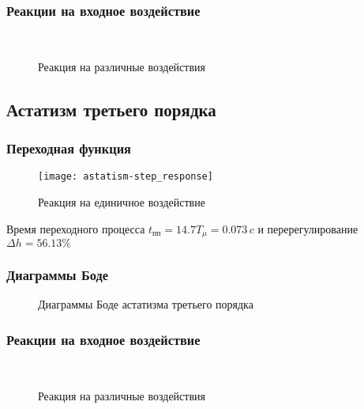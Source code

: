 			\subsubsection{Реакции на входное воздействие}
				\begin{figure}[H]
					\centering
					\\
					\centering{}
					\caption{Реакция на различные воздействия}
				\end{figure}
		\subsection{Астатизм третьего порядка}
			\subsubsection{Переходная функция}
				\begin{figure}[H]
					\centering
					\texttt{[image: astatism-step\_response]}
					\caption{Реакция на единичное воздействие}
				\end{figure}
				Время переходного процесса $t_{\text{пп}}=14.7T_{\mu}=0.073\,c$ и перерегулирование $\Delta h=56.13\%$
			\subsubsection{Диаграммы Боде}
				\begin{figure}[H]
					\centering
					\caption{Диаграммы Боде астатизма третьего порядка}
				\end{figure}
			\subsubsection{Реакции на входное воздействие}
				\begin{figure}[H]
					\centering
					\\
					\centering{}
					\caption{Реакция на различные воздействия}
				\end{figure}
